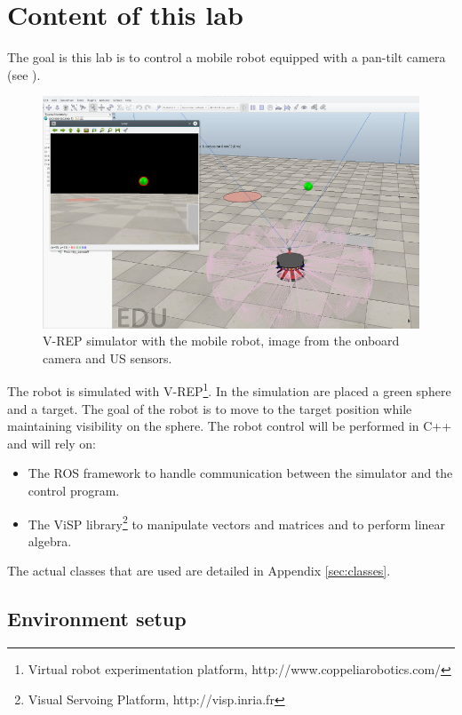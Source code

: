 \documentclass{ecnreport}
\begin{document}




\section{Content of this lab}

The goal is this lab is to control a mobile robot equipped with a pan-tilt camera 
 (see ).

\begin{figure}[h!]\centering
 \includegraphics[width=.8\linewidth]{vrep}
 \caption{V-REP simulator with the mobile robot, image from the onboard camera and US sensors.}
 \label{fig:vrep}
\end{figure}

The robot is simulated with V-REP\footnote{Virtual robot experimentation platform, http://www.coppeliarobotics.com/}.
In the simulation are placed a green sphere and a target. The goal of the robot is to move to the target position while maintaining visibility on the sphere.
The robot control will be performed in C++ and will rely on:

\begin{itemize}
 \item The ROS framework to handle communication between the simulator and the control program.
 \item The ViSP library\footnote{Visual Servoing Platform, http://visp.inria.fr} to manipulate vectors and matrices and to perform linear algebra.
\end{itemize}
The actual classes that are used are detailed in Appendix \ref{sec:classes}.\\

\subsection{Environment setup}
\end{document}
